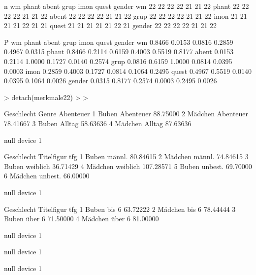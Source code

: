 \begin{Schunk}
\begin{Soutput}
n
       wm phant abent grup imon quest gender
wm     22    22    22   22   21    21     22
phant  22    22    22   22   21    21     22
abent  22    22    22   22   21    21     22
grup   22    22    22   22   21    21     22
imon   21    21    21   21   22    21     21
quest  21    21    21   21   21    22     21
gender 22    22    22   22   21    21     22

P
       wm     phant  abent  grup   imon   quest  gender
wm            0.8466 0.0153 0.0816 0.2859 0.4967 0.0315
phant  0.8466        0.2114 0.6159 0.4003 0.5519 0.8177
abent  0.0153 0.2114        1.0000 0.1727 0.0140 0.2574
grup   0.0816 0.6159 1.0000        0.0814 0.0395 0.0003
imon   0.2859 0.4003 0.1727 0.0814        0.1064 0.2495
quest  0.4967 0.5519 0.0140 0.0395 0.1064        0.0026
gender 0.0315 0.8177 0.2574 0.0003 0.2495 0.0026       
\end{Soutput}
\begin{Sinput}
> detach(merkmale22)
> 
> 
\end{Sinput}
\end{Schunk}


















\begin{Schunk}
\begin{Soutput}
  Geschlecht     Genre Abenteuer
1      Buben Abenteuer  88.75000
2    Mädchen Abenteuer  78.41667
3      Buben    Alltag  58.63636
4    Mädchen    Alltag  87.63636
\end{Soutput}
\begin{Soutput}
null device 
          1 
\end{Soutput}
\begin{Soutput}
  Geschlecht Titelfigur       tfg
1      Buben     männl.  80.84615
2    Mädchen     männl.  74.84615
3      Buben   weiblich  36.71429
4    Mädchen   weiblich 107.28571
5      Buben    unbest.  69.70000
6    Mädchen    unbest.  66.00000
\end{Soutput}
\begin{Soutput}
null device 
          1 
\end{Soutput}
\begin{Soutput}
  Geschlecht Titelfigur      tfg
1      Buben      bis 6 63.72222
2    Mädchen      bis 6 78.44444
3      Buben     über 6 71.50000
4    Mädchen     über 6 81.00000
\end{Soutput}
\begin{Soutput}
null device 
          1 
\end{Soutput}
\begin{Soutput}
null device 
          1 
\end{Soutput}
\begin{Soutput}
null device 
          1 
\end{Soutput}
\end{Schunk}



